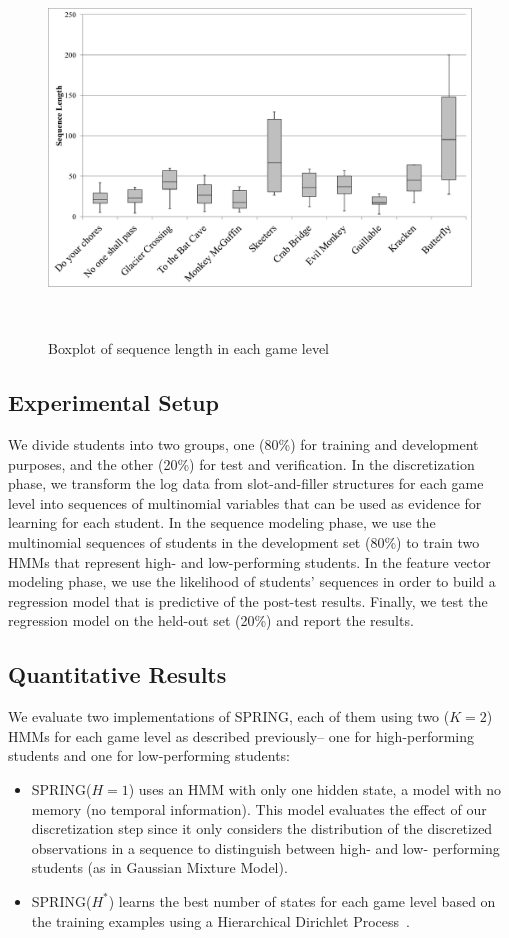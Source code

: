 \documentclass{sigchi}
\def\algname{SPRING\xspace}
\begin{document}
	\begin{figure}
		\centering
		\includegraphics[width=0.9\columnwidth]{figures/boxplot.pdf}
		\caption{Boxplot of sequence length in each game level}~\label{fig:boxplot}
	\end{figure}
		

	\subsection{Experimental Setup}
	We divide students into two groups, one (80\%) for training and development purposes, and the other (20\%) for test and verification.
	In the discretization phase, we transform the log data from slot-and-filler structures for each game level into sequences of multinomial variables that can be used as evidence for learning for each student.
	In the sequence modeling phase, we use the multinomial sequences of students in the development set (80\%) to train two HMMs that represent high- and low-performing students.
	In the feature vector modeling phase, we use the likelihood of students' sequences in order to build a regression model that is predictive of the post-test results.
	Finally, we test the regression model on the held-out set (20\%) and report the results.
	\newline
	
	\subsection{Quantitative Results}
	
	
	We evaluate two implementations of SPRING, each of them using two ($K=2$) HMMs for each game level as described previously-- one for high-performing students and one for low-performing students:
	
	\begin{itemize}
		\item \algname ($H=1$) uses an HMM with only one hidden state, a model with no memory (no temporal information). This model evaluates the effect of our discretization step since it only considers the distribution of the discretized observations in a sequence to distinguish between high- and low- performing students (as in Gaussian Mixture Model).

		\item \algname ($H^*$) learns the best number of states for each game level based on the training examples using a Hierarchical Dirichlet Process~\cite{fox2008hdp}.
	\end{itemize} 
	
\end{document}
